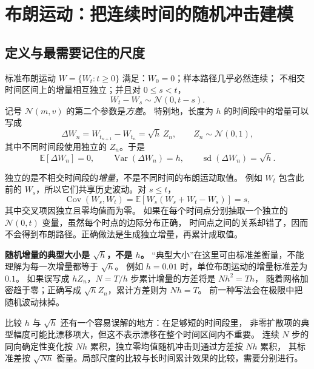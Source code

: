 \documentclass[11pt,a4paper,fontset=none]{ctexart}
\numberwithin{equation}{section}
\newcommand{\E}{\mathbb E}
\DeclareMathOperator{\Var}{Var}
\DeclareMathOperator{\Cov}{Cov}
\begin{document}
\section{布朗运动：把连续时间的随机冲击建模}
\label{bg:sec:brownian}

\subsection{定义与最需要记住的尺度}
\label{bg:sub:brownian-definition}

标准布朗运动 $W=\{W_t:t\geq0\}$ 满足：$W_0=0$；样本路径几乎必然连续；
不相交时间区间上的增量相互独立；并且对 $0\leq s<t$，
\begin{equation}
  W_t-W_s\sim\mathcal N(0,t-s).
  \label{bg:eq:brownian-increment}
\end{equation}
记号 $\mathcal N(m,v)$ 的第二个参数是\emph{方差}。
特别地，长度为 $h$ 的时间段中的增量可以写成
\begin{equation}
  \Delta W_n=W_{t_{n+1}}-W_{t_n}=\sqrt h\,Z_n,
  \qquad Z_n\sim\mathcal N(0,1),
  \label{bg:eq:normal-scaling}
\end{equation}
其中不同时间段使用独立的 $Z_n$。于是
\begin{equation}
  \E[\Delta W_n]=0,\qquad
  \Var(\Delta W_n)=h,\qquad
  \operatorname{sd}(\Delta W_n)=\sqrt h.
  \label{bg:eq:increment-moments}
\end{equation}

独立的是不相交时间段的\emph{增量}，不是不同时间的布朗运动取值。
例如 $W_t$ 包含此前的 $W_s$，所以它们共享历史波动。对 $s\leq t$，
\begin{equation}
  \Cov(W_s,W_t)=\E[W_s(W_s+W_t-W_s)]=s,
  \label{bg:eq:brownian-covariance}
\end{equation}
其中交叉项因独立且零均值而为零。
如果在每个时间点分别抽取一个独立的 $\mathcal N(0,t)$ 变量，虽然每个时点的边际分布正确，
时间点之间的关系却错了，因而不会得到布朗路径。正确做法是生成独立增量，再累计成取值。

\textbf{随机增量的典型大小是 $\sqrt h$，不是 $h$。}
“典型大小”在这里可由标准差衡量，不能理解为每一次增量都等于 $\sqrt h$。
例如 $h=0.01$ 时，单位布朗运动的增量标准差为 $0.1$。
如果误写成 $hZ_n$，$N=T/h$ 步累计增量的方差将是 $Nh^2=Th$，
随着网格加密趋于零；正确写成 $\sqrt h Z_n$，累计方差则为 $Nh=T$。
前一种写法会在极限中把随机波动抹掉。

比较 $h$ 与 $\sqrt h$ 还有一个容易误解的地方：在足够短的时间段里，
非零扩散项的典型幅度可能比漂移项大，但这不表示漂移在整个时间区间内不重要。
连续 $N$ 步的同向确定性变化按 $Nh$ 累积，独立零均值随机冲击则通过方差按 $Nh$ 累积，
其标准差按 $\sqrt{Nh}$ 衡量。局部尺度的比较与长时间累计效果的比较，需要分别进行。
\end{document}
